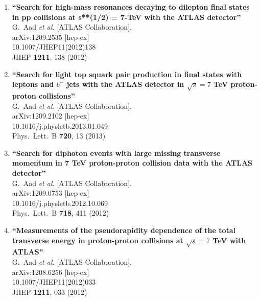 \documentclass{article}
\begin{document}
\begin{enumerate}
\item%
{\bf ``Search for high-mass resonances decaying to dilepton final states in pp collisions at s**(1/2) = 7-TeV with the ATLAS detector''}
  \\{}G.~Aad {\it et al.}  [ATLAS Collaboration].
  \\{}arXiv:1209.2535 [hep-ex]
    \\{}10.1007/JHEP11(2012)138
\\{}JHEP {\bf 1211}, 138 (2012) %


\item%
{\bf ``Search for light top squark pair production in final states with leptons and $b^-$ jets with the ATLAS detector in $\sqrt{s}=7$ TeV proton-proton collisions''}
  \\{}G.~Aad {\it et al.}  [ATLAS Collaboration].
  \\{}arXiv:1209.2102 [hep-ex]
    \\{}10.1016/j.physletb.2013.01.049
\\{}Phys.\ Lett.\ B {\bf 720}, 13 (2013) %


\item%
{\bf ``Search for diphoton events with large missing transverse momentum in 7 TeV proton-proton collision data with the ATLAS detector''}
  \\{}G.~Aad {\it et al.}  [ATLAS Collaboration].
  \\{}arXiv:1209.0753 [hep-ex]
    \\{}10.1016/j.physletb.2012.10.069
\\{}Phys.\ Lett.\ B {\bf 718}, 411 (2012) %


\item%
{\bf ``Measurements of the pseudorapidity dependence of the total transverse energy in proton-proton collisions at $\sqrt{s}=7$ TeV with ATLAS''}
  \\{}G.~Aad {\it et al.}  [ATLAS Collaboration].
  \\{}arXiv:1208.6256 [hep-ex]
    \\{}10.1007/JHEP11(2012)033
\\{}JHEP {\bf 1211}, 033 (2012) %



\end{enumerate}
\end{document}

